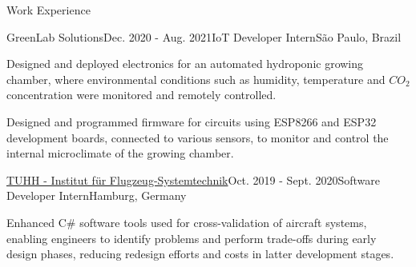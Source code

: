 \documentclass{resume} %
\begin{document}
\begin{rSection}{Work Experience}
\begin{rSubsection}{GreenLab Solutions}{Dec. 2020 - Aug. 2021}{IoT Developer Intern}{São Paulo, Brazil}
\item Designed and deployed electronics for an automated hydroponic growing chamber, where environmental conditions such as humidity, temperature and $CO_{2}$ concentration were monitored and remotely controlled.
\item Designed and programmed firmware for circuits using ESP8266 and ESP32 development boards, connected to various sensors, to monitor and control the internal microclimate of the growing chamber.
\end{rSubsection}

\begin{rSubsection}{\href{https://www.fst.tu-harburg.de/institut/willkommen}{TUHH - Institut f\"ur Flugzeug-Systemtechnik}}{Oct. 2019 - Sept. 2020}{Software Developer Intern}{Hamburg, Germany}

\item Enhanced C\# software tools used for cross-validation of aircraft systems, enabling engineers to identify problems and perform trade-offs during early design phases, reducing redesign efforts and costs in latter development stages.
\end{rSubsection}

\end{rSection}

\vspace{-0.3cm}
\end{document}
